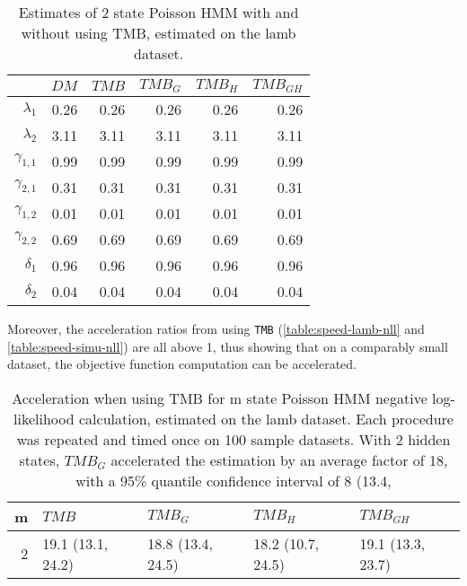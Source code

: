 \documentclass[bimj,fleqn]{w-art}\usepackage[]{graphicx}\usepackage[]{color}
\theoremstyle{plain}
\theoremstyle{definition}
\begin{document}
\begin{table}[ht]
\centering
\begin{tabular}{rrrrrr}
  \hline
 & \textit{${DM}$} & \textit{${TMB}$} & \textit{${TMB_G}$} & \textit{${TMB_H}$} & \textit{${TMB_{GH}}$} \\ 
  \hline
$\lambda_{1}$ & 0.26 & 0.26 & 0.26 & 0.26 & 0.26 \\ 
  $\lambda_{2}$ & 3.11 & 3.11 & 3.11 & 3.11 & 3.11 \\ 
  $\gamma_{1, 1}$ & 0.99 & 0.99 & 0.99 & 0.99 & 0.99 \\ 
  $\gamma_{2, 1}$ & 0.31 & 0.31 & 0.31 & 0.31 & 0.31 \\ 
  $\gamma_{1, 2}$ & 0.01 & 0.01 & 0.01 & 0.01 & 0.01 \\ 
  $\gamma_{2, 2}$ & 0.69 & 0.69 & 0.69 & 0.69 & 0.69 \\ 
  $\delta_{1}$ & 0.96 & 0.96 & 0.96 & 0.96 & 0.96 \\ 
  $\delta_{2}$ & 0.04 & 0.04 & 0.04 & 0.04 & 0.04 \\ 
   \hline
\end{tabular}
\caption{Estimates of 2 state Poisson HMM with and without using TMB, estimated on the lamb dataset.} 
\label{table:2-state-lamb-estimates}
\end{table}




Moreover, the acceleration ratios from using {\tt{TMB}} (\autoref{table:speed-lamb-nll} and \autoref{table:speed-simu-nll}) are all above 1, thus showing that on a comparably small dataset, the objective function computation can be accelerated.

\begin{table}[ht]
\centering
\begin{tabular}{rllll}
  \hline
m & \textit{${TMB}$} & \textit{${TMB_G}$} & \textit{${TMB_H}$} & \textit{${TMB_{GH}}$} \\ 
  \hline
2 & 19.1 (13.1, 24.2) & 18.8 (13.4, 24.5) & 18.2 (10.7, 24.5) & 19.1 (13.3, 23.7) \\ 
   \hline
\end{tabular}
\caption{Acceleration when using TMB for m state Poisson HMM negative log-likelihood calculation, estimated on the lamb dataset. Each procedure was repeated and timed once on 100 sample datasets. With 2 hidden states, $TMB_G$ accelerated the estimation by an average factor of 18, with a 95\% quantile confidence interval of 8 (13.4,} 
\label{table:speed-lamb-nll}
\end{table}
\end{document}

